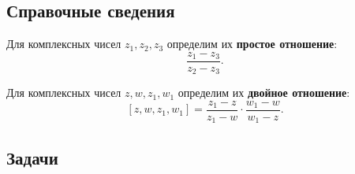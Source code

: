 \begin{enumerate}
\end{enumerate}

\subsection*{Справочные сведения}

Для комплексных чисел $z_1,z_2,z_3$ определим их \textbf{простое отношение}:
$$
\frac{z_1-z_3}{z_2-z_3}.
$$


Для комплексных чисел $z,w,z_1,w_1$ определим их \textbf{двойное отношение}:
$$
[z,w,z_1,w_1] = \frac{z_1-z}{z_1-w}\cdot\frac{w_1-w}{w_1-z}.
$$


\subsection*{Задачи}

